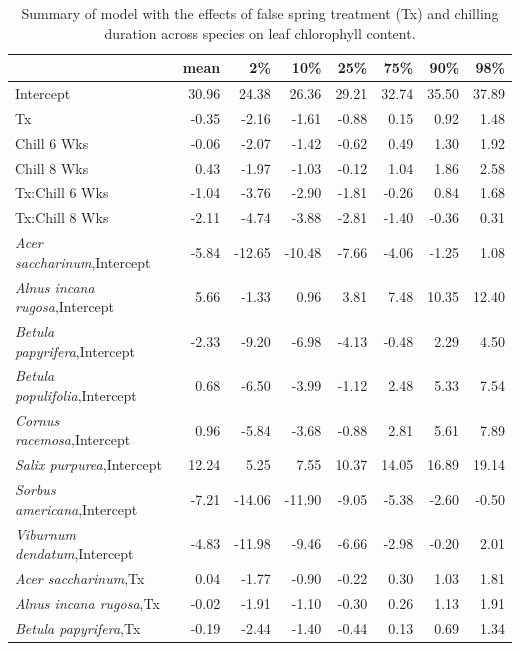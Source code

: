 \documentclass{article}\usepackage[]{graphicx}\usepackage[]{color}
\begin{document}
  
\newpage
\begin{longtable}{lrrrrrrr}
\caption{Summary of model with the effects of false spring treatment (Tx) and chilling duration across species on leaf chlorophyll content.} \\ 
  \hline
 & mean & 2\% & 10\% & 25\% & 75\% & 90\% & 98\% \\ 
  \hline \endhead  \hline
Intercept & 30.96 & 24.38 & 26.36 & 29.21 & 32.74 & 35.50 & 37.89 \\ 
  Tx & -0.35 & -2.16 & -1.61 & -0.88 & 0.15 & 0.92 & 1.48 \\ 
  Chill 6 Wks & -0.06 & -2.07 & -1.42 & -0.62 & 0.49 & 1.30 & 1.92 \\ 
  Chill 8 Wks & 0.43 & -1.97 & -1.03 & -0.12 & 1.04 & 1.86 & 2.58 \\ 
  Tx:Chill 6 Wks & -1.04 & -3.76 & -2.90 & -1.81 & -0.26 & 0.84 & 1.68 \\ 
  Tx:Chill 8 Wks & -2.11 & -4.74 & -3.88 & -2.81 & -1.40 & -0.36 & 0.31 \\ 
  \textit{Acer saccharinum},Intercept & -5.84 & -12.65 & -10.48 & -7.66 & -4.06 & -1.25 & 1.08 \\ 
  \textit{Alnus incana rugosa},Intercept & 5.66 & -1.33 & 0.96 & 3.81 & 7.48 & 10.35 & 12.40 \\ 
  \textit{Betula papyrifera},Intercept & -2.33 & -9.20 & -6.98 & -4.13 & -0.48 & 2.29 & 4.50 \\ 
  \textit{Betula populifolia},Intercept & 0.68 & -6.50 & -3.99 & -1.12 & 2.48 & 5.33 & 7.54 \\ 
  \textit{Cornus racemosa},Intercept & 0.96 & -5.84 & -3.68 & -0.88 & 2.81 & 5.61 & 7.89 \\ 
  \textit{Salix purpurea},Intercept & 12.24 & 5.25 & 7.55 & 10.37 & 14.05 & 16.89 & 19.14 \\ 
  \textit{Sorbus americana},Intercept & -7.21 & -14.06 & -11.90 & -9.05 & -5.38 & -2.60 & -0.50 \\ 
  \textit{Viburnum dendatum},Intercept & -4.83 & -11.98 & -9.46 & -6.66 & -2.98 & -0.20 & 2.01 \\ 
  \textit{Acer saccharinum},Tx & 0.04 & -1.77 & -0.90 & -0.22 & 0.30 & 1.03 & 1.81 \\ 
  \textit{Alnus incana rugosa},Tx & -0.02 & -1.91 & -1.10 & -0.30 & 0.26 & 1.13 & 1.91 \\ 
  \textit{Betula papyrifera},Tx & -0.19 & -2.44 & -1.40 & -0.44 & 0.13 & 0.69 & 1.34 \\ 

\end{longtable}
\end{document}
